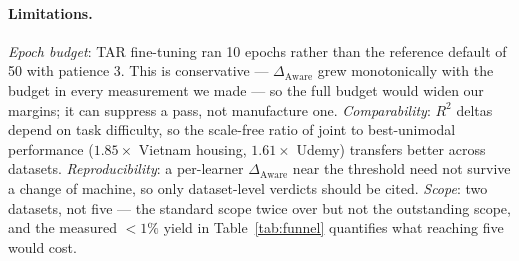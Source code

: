 \documentclass[10pt,letterpaper]{article}
\newcommand{\da}{\Delta_{\mathrm{Aware}}}
\begin{document}
\paragraph{Limitations.} \emph{Epoch budget}: TAR fine-tuning ran 10 epochs rather than the
reference default of 50 with patience 3. This is conservative --- $\da$ grew monotonically with
the budget in every measurement we made --- so the full budget would widen our margins; it can
suppress a pass, not manufacture one. \emph{Comparability}: $R^2$ deltas depend on task
difficulty, so the scale-free ratio of joint to best-unimodal performance ($1.85\times$ Vietnam
housing, $1.61\times$ Udemy) transfers better across datasets. \emph{Reproducibility}: a
per-learner $\da$ near the threshold need not survive a change of machine, so only
dataset-level verdicts should be cited. \emph{Scope}: two datasets, not five --- the standard
scope twice over but not the outstanding scope, and the measured ${<}1\%$ yield in
Table~\ref{tab:funnel} quantifies what reaching five would cost.
\end{document}
